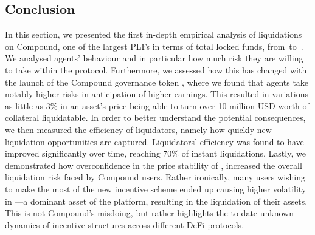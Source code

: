 \subsection{Conclusion}
\label{sec:5b:conclusion}
In this section, we presented the first in-depth empirical analysis of liquidations on Compound, one of the largest PLFs in terms of total locked funds, from~\StartDate to~\EndDate.
We analysed agents' behaviour and in particular how much risk they are willing to take within the protocol.
Furthermore, we assessed how this has changed with the launch of the Compound governance token , where we found that agents take notably higher risks in anticipation of higher earnings.
This resulted in variations as little as 3\% in an asset's price being able to turn over 10 million USD worth of collateral liquidatable.
In order to better understand the potential consequences, we then measured the efficiency of liquidators, namely how quickly new liquidation opportunities are captured. Liquidators' efficiency was found to have improved significantly over time, reaching 70\% of instant liquidations.
Lastly, we demonstrated how overconfidence in the price stability of , increased the overall liquidation risk faced by Compound users.
Rather ironically, many users wishing to make the most of the new incentive scheme ended up causing higher volatility in ---a dominant asset of the platform, resulting in the liquidation of their assets.
This is not Compound's misdoing, but rather highlights the to-date unknown dynamics of incentive structures across different DeFi protocols.
